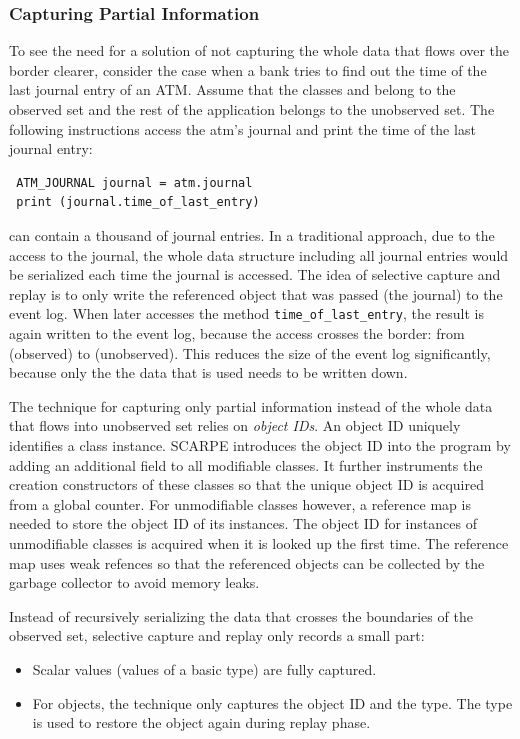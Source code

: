 \subsubsection{Capturing Partial Information}
To see the need for a solution of not capturing the whole data that flows over the border clearer, consider the case when a bank tries to find out the time of the last journal entry of an ATM. Assume that the classes  and  belong to the observed set and the rest of the application belongs to the unobserved set. The following instructions access the atm's journal and print the time of the last journal entry:

\javalisting
\begin{lstlisting}
 ATM_JOURNAL journal = atm.journal
 print (journal.time_of_last_entry)
\end{lstlisting}

 can contain a thousand of journal entries. In a traditional approach, due to the access to the journal, the whole data structure including all journal entries would be serialized each time the journal is accessed. The idea of selective capture and replay is to only write the referenced object that was passed (the journal) to the event log. When later  accesses the method \texttt{time\_of\_last\_entry}, the result is again written to the event log, because the access crosses the border: from  (observed) to  (unobserved). This reduces the size of the event log significantly, because only the the data that is used needs to be written down.

The technique for capturing only partial information instead of the whole data that flows into unobserved set relies on \emph{object IDs}. An object ID uniquely identifies a class instance. SCARPE introduces the object ID into the program by adding an additional field to all modifiable classes. It further instruments the creation constructors of these classes so that the unique object ID is acquired from a global counter. For unmodifiable classes however, a reference map is needed to store the object ID of its instances. The object ID for instances of unmodifiable classes is acquired when it is looked up the first time. The reference map uses weak refences so that the referenced objects can be collected by the garbage collector to avoid memory leaks.

Instead of recursively serializing the data that crosses the boundaries of the observed set, selective capture and replay only records a small part:
\begin{itemize}
 \item Scalar values (values of a basic type) are fully captured.
 \item For objects, the technique only captures the object ID and the type. The type is used to restore the object again during replay phase.
\end{itemize}

